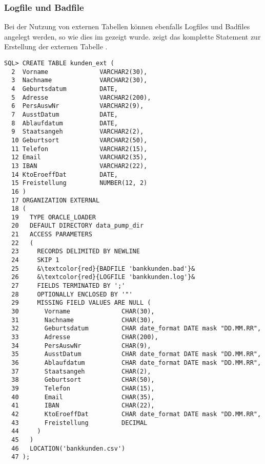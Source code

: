         \subsubsection{Logfile und Badfile}
          Bei der Nutzung von externen Tabellen können ebenfalls Logfiles und Badfiles angelegt werden, so wie dies im  gezeigt wurde.  zeigt das komplette Statement zur Erstellung der externen Tabelle .
\clearpage
          \begin{lstlisting}[caption={Logfile und Badfile},label=admin929,language=oracle_sql]
SQL> CREATE TABLE kunden_ext (
  2  Vorname              VARCHAR2(30),
  3  Nachname             VARCHAR2(30),
  4  Geburtsdatum         DATE,
  5  Adresse              VARCHAR2(200),
  6  PersAuswNr           VARCHAR2(9),
  7  AusstDatum           DATE,
  8  Ablaufdatum          DATE,
  9  Staatsangeh          VARCHAR2(2),
  10 Geburtsort           VARCHAR2(50),
  11 Telefon              VARCHAR2(15),
  12 Email                VARCHAR2(35),
  13 IBAN                 VARCHAR2(22),
  14 KtoEroeffDat         DATE,
  15 Freistellung         NUMBER(12, 2)
  16 )
  17 ORGANIZATION EXTERNAL
  18 (
  19   TYPE ORACLE_LOADER
  20   DEFAULT DIRECTORY data_pump_dir
  21   ACCESS PARAMETERS
  22   (
  23     RECORDS DELIMITED BY NEWLINE
  24     SKIP 1
  25     &\textcolor{red}{BADFILE 'bankkunden.bad'}&
  26     &\textcolor{red}{LOGFILE 'bankkunden.log'}&
  27     FIELDS TERMINATED BY ';'
  28     OPTIONALLY ENCLOSED BY '"'
  29     MISSING FIELD VALUES ARE NULL (
  30       Vorname              CHAR(30),
  31       Nachname             CHAR(30),
  32       Geburtsdatum         CHAR date_format DATE mask "DD.MM.RR",
  33       Adresse              CHAR(200),
  34       PersAuswNr           CHAR(9),
  35       AusstDatum           CHAR date_format DATE mask "DD.MM.RR",
  36       Ablaufdatum          CHAR date_format DATE mask "DD.MM.RR",
  37       Staatsangeh          CHAR(2),
  38       Geburtsort           CHAR(50),
  39       Telefon              CHAR(15),
  40       Email                CHAR(35),
  41       IBAN                 CHAR(22),
  42       KtoEroeffDat         CHAR date_format DATE mask "DD.MM.RR",
  43       Freistellung         DECIMAL
  44     )
  45   )
  46   LOCATION('bankkunden.csv')
  47 );
          \end{lstlisting}
          \begin{literaturinternet}
            \item \cite{b28319et_params}
          \end{literaturinternet}
